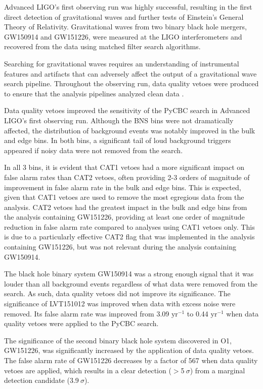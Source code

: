 Advanced LIGO's first observing run was highly successful, resulting in the first direct detection of 
gravitational waves and further tests of Einstein's General Theory of Relativity. Gravitational waves 
from two binary black hole mergers, GW150914 and GW151226, were measured at the LIGO interferometers 
and recovered from the data using matched filter search algorithms. 

Searching for gravitational waves requires an understanding of instrumental
features and artifacts that can adversely affect the output of a gravitational wave
search pipeline. Throughout the observing run, data quality vetoes were produced
to ensure that the analysis pipelines analyzed clean data \cite{GW150914-DETCHAR}.

Data quality vetoes improved the sensitivity of the PyCBC search in Advanced LIGO's first
observing run. Although the BNS bins were not dramatically affected, the distribution
of background events was notably improved in the bulk and edge bins.
In both bins, a significant tail of loud background triggers appeared
if noisy data were not removed from the search.

In all 3 bins, it is evident that CAT1 vetoes had a more significant impact on false alarm rates
than CAT2 vetoes, often providing 2-3 orders of magnitude of improvement in false alarm rate in the bulk
and edge bins. This is expected, given that CAT1 vetoes are used to remove the most egregious
data from the analysis. CAT2 vetoes had the greatest impact in the bulk and edge bins from the
analysis containing GW151226, providing at least one order of magnitude reduction in false alarm
rate compared to analyses using CAT1 vetoes only. This is due to a particularly effective CAT2 flag that
was implemented in the
analysis containing GW151226, but was not relevant during the analysis containing GW150914.

The black hole binary system GW150914 was a strong enough signal that it was louder than all background
events regardless of what data were removed from the search. As such, data quality vetoes did not
improve its significance.
The significance of LVT151012 was improved when data with excess noise were removed. Its
false alarm rate was improved from 3.09 $\mathrm{yr}^{-1}$ to 0.44 $\mathrm{yr}^{-1}$ when data quality vetoes were applied
to the PyCBC search.

The significance of the second binary black hole system discovered in O1, GW151226, was significantly
increased by the application of data quality vetoes. The false alarm rate of GW151226 decreases by a
factor of 567 when data quality vetoes are applied, which results in a clear detection ($>$5$~\sigma$) from a
marginal detection candidate (3.9$~\sigma$).
